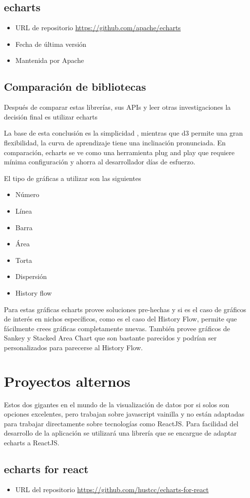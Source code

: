 \subsection{ echarts }
\begin{itemize}
    \item URL de repositorio \href{https://github.com/apache/echarts}{https://github.com/apache/echarts}
    \item Fecha de última versión
    \item Mantenida por Apache
\end{itemize}

\subsection{ Comparación de bibliotecas }

Después de comparar estas librerías, sus APIs y leer otras investigaciones la decisión final es utilizar echarts

La base de esta conclusión es la simplicidad \cite{EchartsDecision}, mientras que d3 permite una gran flexibilidad, la curva de aprendizaje tiene una inclinación pronunciada. 
En comparación, echarts se ve como una herramienta plug and play que requiere mínima configuración y ahorra al desarrollador días de esfuerzo.

El tipo de gráficas a utilizar son las siguientes
\begin{itemize}    
    \item Número
    \item Línea
    \item Barra
    \item Área
    \item Torta
    \item Dispersión
    \item History flow
\end{itemize}

Para estas gráficas echarts provee soluciones pre-hechas y si es el caso de gráficos de interés en nichos específicos, como es el caso del History Flow, permite que fácilmente crees gráficas completamente nuevas. 
También provee gráficos de Sankey y Stacked Area Chart que son bastante parecidos y podrían ser personalizados para parecerse al History Flow. 

\section{ Proyectos alternos }
Estos dos gigantes en el mundo de la visualización de datos por si solos son opciones excelentes, pero trabajan sobre javascript vainilla y no están adaptadas para trabajar directamente sobre tecnologías como ReactJS. 
Para facilidad del desarrollo de la aplicación se utilizará una librería que se encargue de adaptar echarts a ReactJS.

\subsection{ echarts for react }
\begin{itemize}
    \item URL del repositorio \href{https://github.com/hustcc/echarts-for-react}{https://github.com/hustcc/echarts-for-react}
\end{itemize}